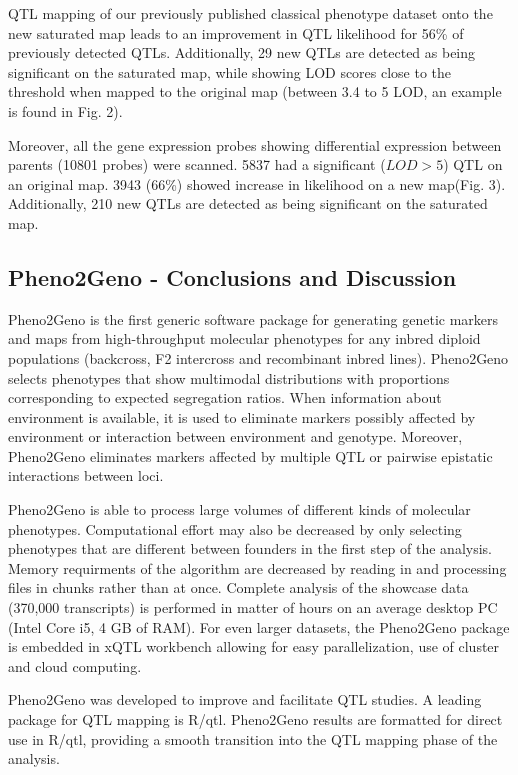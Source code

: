 \documentclass[8pt, twoside, a5paper]{report}
\begin{document}
QTL mapping of our previously published classical phenotype dataset\cite{Joosen:2011} onto the new saturated map leads to 
an improvement in QTL likelihood for 56\% of previously detected QTLs. Additionally, 29 new QTLs are detected 
as being significant on the saturated map, while showing LOD scores close to the threshold when mapped to the original 
map (between 3.4 to 5 LOD, an example is found in Fig. 2).

Moreover, all the gene expression probes showing differential expression between parents (10801 probes) were scanned. 5837
had a significant ($LOD > 5$) QTL on an original map. 3943 (66\%) showed increase in likelihood on a new map(Fig. 3). 
Additionally, 210 new QTLs are detected as being significant on the saturated map.
  
\subsection{Pheno2Geno - Conclusions and Discussion}
Pheno2Geno is the first generic software package for generating genetic markers and maps from high-throughput molecular 
phenotypes for any inbred diploid populations (backcross, F2 intercross and recombinant inbred lines). Pheno2Geno selects 
phenotypes that show multimodal distributions with proportions corresponding to expected segregation ratios. When 
information about environment is available, it is used to eliminate markers possibly affected by environment or 
interaction between environment and genotype. Moreover, Pheno2Geno eliminates markers affected by multiple QTL or 
pairwise epistatic interactions between loci.

Pheno2Geno is able to process large volumes of different kinds of molecular phenotypes\cite{Trelles:2011}. Computational 
effort may also be decreased by only selecting phenotypes that are different between founders in the first step of the 
analysis. Memory requirments of the algorithm are decreased by reading in and processing files in chunks rather than at once. 
Complete analysis of the showcase data (370,000 transcripts) is performed in matter of hours on an average 
desktop PC (Intel Core i5, 4 GB of RAM). For even larger datasets, the Pheno2Geno package is embedded in xQTL workbench
\cite{Arends:2012, arends2:2012} allowing for easy parallelization, use of cluster and cloud computing.\newline

Pheno2Geno was developed to improve and facilitate QTL studies. A leading package for QTL mapping is R/qtl. 
Pheno2Geno results are formatted for direct use in R/qtl, providing a smooth transition into the QTL mapping phase 
of the analysis. \newline
\end{document}
